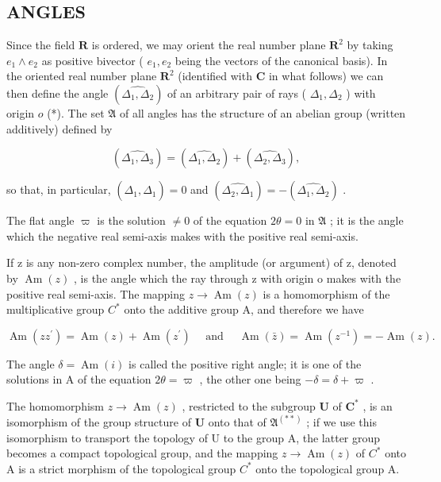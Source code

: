 \subsection{ANGLES}

Since the field \(\mathbf{R}\) is ordered, we may orient the real number plane \(\mathbf{R}^2\) by taking \(e_1 \wedge e_2\) as positive bivector ( \(e_1, e_2\) being the vectors of the canonical basis). In the oriented real number plane \(\mathbf{R}^2\) (identified with \(\mathbf{C}\) in what follows) we can then define the angle \((\widehat{\Delta_1, \Delta_2})\) of an arbitrary pair of rays ( \(\Delta_1, \Delta_2\) ) with origin \(o\) (*). The set \(\mathfrak{A}\) of all angles has the structure of an abelian group (written additively) defined by

\[
(\widehat {\Delta_ {1} , \Delta_ {3}}) = (\widehat {\Delta_ {1} , \Delta_ {2}}) + (\widehat {\Delta_ {2} , \Delta_ {3}}),
\]

so that, in particular, \((\widehat{\Delta_1, \Delta_1}) = 0\) and \((\widehat{\Delta_2, \Delta_1}) = -(\widehat{\Delta_1, \Delta_2})\) .

The flat angle \(\varpi\) is the solution \(\neq 0\) of the equation \(2\theta = 0\) in \(\mathfrak{A}\) ; it is the angle which the negative real semi-axis makes with the positive real semi-axis.

If z is any non-zero complex number, the amplitude (or argument) of z, denoted by \(\operatorname{Am}(z)\) , is the angle which the ray through z with origin o makes with the positive real semi-axis. The mapping \(z \to \operatorname{Am}(z)\) is a homomorphism of the multiplicative group \(C^{*}\) onto the additive group A, and therefore we have

\[
\operatorname{Am} \left(z z ^ {\prime}\right) = \operatorname{Am} (z) + \operatorname{Am} \left(z ^ {\prime}\right) \quad \text { and } \quad \operatorname{Am} (\bar {z}) = \operatorname{Am} \left(z ^ {- 1}\right) = - \operatorname{Am} (z).
\]

The angle \(\delta = \operatorname{Am}(i)\) is called the positive right angle; it is one of the solutions in A of the equation \(2\theta = \varpi\) , the other one being \(-\delta = \delta + \varpi\) .

The homomorphism \(z \to \operatorname{Am}(z)\) , restricted to the subgroup \(\mathbf{U}\) of \(\mathbf{C}^*\) , is an isomorphism of the group structure of \(\mathbf{U}\) onto that of \(\mathfrak{A}^{(**)}\) ; if we use this isomorphism to transport the topology of U to the group A, the latter group becomes a compact topological group, and the mapping \(z \to \operatorname{Am}(z)\) of \(C^{*}\) onto A is a strict morphism of the topological group \(C^{*}\) onto the topological group A.

